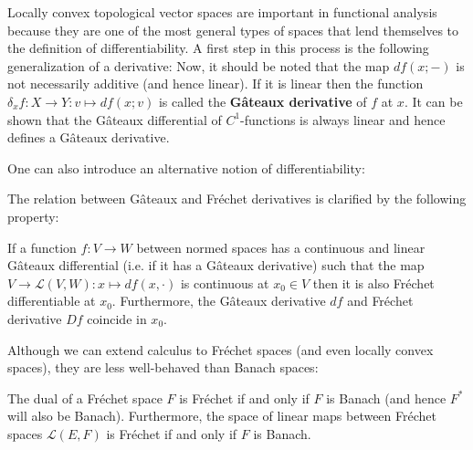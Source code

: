     Locally convex topological vector spaces are important in functional analysis because they are one of the most general types of spaces that lend themselves to the definition of differentiability. A first step in this process is the following generalization of a derivative:
    Now, it should be noted that the map $df(x;-)$ is not necessarily additive (and hence linear). If it is linear then the function $\delta_xf:X\rightarrow Y:v\mapsto df(x; v)$ is called the \textbf{G\^ateaux derivative} of $f$ at $x$. It can be shown that the G\^ateaux differential of $C^1$-functions is always linear and hence defines a G\^ateaux derivative.

    One can also introduce an alternative notion of differentiability:

    The relation between G\^ateaux and Fr\'echet derivatives is clarified by the following property:
    \begin{property}
        If a function $f:V\rightarrow W$ between normed spaces has a continuous and linear G\^ateaux differential (i.e. if it has a G\^ateaux derivative) such that the map $V\rightarrow\mathcal{L}(V, W):x\mapsto df(x, \cdot)$ is continuous at $x_0\in V$ then it is also Fr\'echet differentiable at $x_0$. Furthermore, the G\^ateaux derivative $df$ and Fr\'echet derivative $Df$ coincide in $x_0$.
    \end{property}

    Although we can extend calculus to Fr\'echet spaces (and even locally convex spaces), they are less well-behaved than Banach spaces:
    \begin{property}
        The dual of a Fr\'echet space $F$ is Fr\'echet if and only if $F$ is Banach (and hence $F^*$ will also be Banach). Furthermore, the space of linear maps between Fr\'echet spaces $\mathcal{L}(E, F)$ is Fr\'echet if and only if $F$ is Banach.
    \end{property}